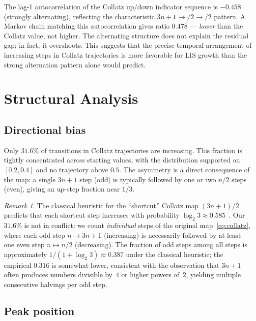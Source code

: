 \documentclass[11pt]{article}
\theoremstyle{definition}
\theoremstyle{remark}
\newtheorem{remark}[theorem]{Remark}
\begin{document}
The lag-1 autocorrelation of the Collatz up/down indicator sequence is
$-0.458$ (strongly alternating), reflecting the characteristic $3n+1 \to
/2 \to /2$ pattern. A Markov chain matching this autocorrelation gives
ratio $0.478$ --- \emph{lower} than the Collatz value, not higher. The
alternating structure does not explain the residual gap; in fact, it
overshoots. This suggests that the precise temporal arrangement of
increasing steps in Collatz trajectories is more favorable for LIS growth
than the strong alternation pattern alone would predict.

\section{Structural Analysis}\label{sec:structure}

\subsection{Directional bias}\label{sec:bias}

Only $31.6\%$ of transitions in Collatz trajectories are increasing. This
fraction is tightly concentrated across starting values, with the
distribution supported on $[0.2, 0.4]$ and no trajectory above $0.5$. The
asymmetry is a direct consequence of the map: a single $3n+1$ step (odd) is
typically followed by one or two $n/2$ steps (even), giving an up-step
fraction near $1/3$.

\begin{remark}
The classical heuristic for the ``shortcut'' Collatz map
$(3n+1)/2$ predicts that each shortcut step increases with probability
$\log_2 3 \approx 0.585$~\cite{Lagarias1985}. Our $31.6\%$ is not in
conflict: we count \emph{individual} steps of the original map~\eqref{eq:collatz},
where each odd step $n \mapsto 3n+1$ (increasing) is necessarily followed by
at least one even step $n \mapsto n/2$ (decreasing). The fraction of odd
steps among all steps is approximately $1/(1 + \log_2 3) \approx 0.387$
under the classical heuristic; the empirical $0.316$ is somewhat lower,
consistent with the observation that $3n+1$ often produces numbers
divisible by~$4$ or higher powers of~$2$, yielding multiple consecutive
halvings per odd step.
\end{remark}

\subsection{Peak position}\label{sec:peak}
\end{document}
